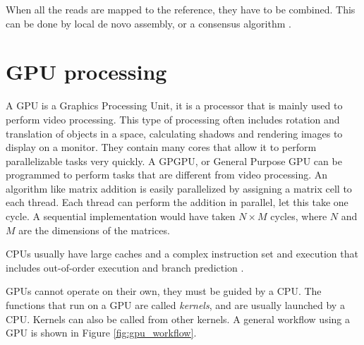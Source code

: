 \documentclass[../main/thesis.tex]{subfiles}
\begin{document}
When all the reads are mapped to the reference, they have to be combined.
This can be done by local de novo assembly, or a consensus algorithm \cite{consensus}.




\section{GPU processing}


A GPU is a Graphics Processing Unit, it is a processor that is mainly used to perform video processing.
This type of processing often includes rotation and translation of objects in a space, calculating shadows and rendering images to display on a monitor.
They contain many cores that allow it to perform parallelizable tasks very quickly.
A GPGPU, or General Purpose GPU can be programmed to perform tasks that are different from video processing.
An algorithm like matrix addition is easily parallelized by assigning a matrix cell to each thread.
Each thread can perform the addition in parallel, let this take one cycle.
A sequential implementation would have taken $N\times M$ cycles, where $N$ and $M$ are the dimensions of the matrices.

CPUs usually have large caches and a complex instruction set and execution that includes out-of-order execution and branch prediction \cite{CPUvsGPU1}\cite{CPUvsGPU2}.

GPUs cannot operate on their own, they must be guided by a CPU.
The functions that run on a GPU are called \textit{kernels}, and are usually launched by a CPU.
Kernels can also be called from other kernels.
A general workflow using a GPU is shown in Figure \ref{fig:gpu_workflow}.


\end{document}
